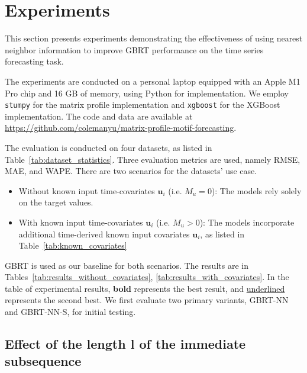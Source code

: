 \section{Experiments} \label{sec:experiments}


This section presents experiments demonstrating the effectiveness of using nearest neighbor information to improve GBRT performance on the time series forecasting task.

The experiments are conducted on a personal laptop equipped with an Apple M1 Pro chip and 16 GB of memory, using Python for implementation.
We employ \texttt{stumpy} for the matrix profile implementation and \texttt{xgboost} for the XGBoost implementation.
The code and data are available at \url{https://github.com/colemanyu/matrix-profile-motif-forecasting}.

The evaluation is conducted on four datasets, as listed in Table~\ref{tab:dataset_statistics}.
Three evaluation metrics are used, namely RMSE, MAE, and WAPE.
There are two scenarios for the datasets' use case.
\begin{itemize}
  \item Without known input time-covariates $\bm{u}_i$ (i.e. $M_u = 0$): The models rely solely on the target values.
  \item With known input time-covariates $\bm{u}_i$ (i.e. $M_u> 0 $): The models incorporate additional time-derived known input covariates $\bm{u}_i$,  as listed in Table~\ref{tab:known_covariates}
\end{itemize}



\textsf{GBRT} is used as our baseline for both scenarios.
The results are in Tables~\ref{tab:results_without_covariates}, 
\ref{tab:results_with_covariates}.
In the table of experimental results, \textbf{bold} represents the best result, and \underline{underlined} represents the second best.
We first evaluate two primary variants, \textsf{GBRT-NN} and \textsf{GBRT-NN-S}, for initial testing.

\subsection{Effect of the length l of the immediate subsequence} %

